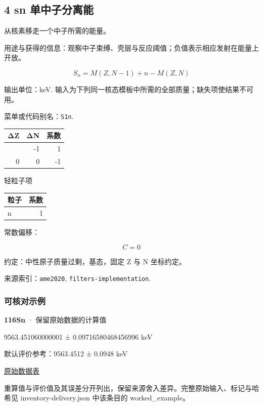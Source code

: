\documentclass[
  11pt,
  letterpaper,
]{article}
\begin{document}
\subsection{4 sn
单中子分离能}\label{sn-ux5355ux4e2dux5b50ux5206ux79bbux80fd}

从核素移走一个中子所需的能量。

用途与获得的信息：观察中子束缚、壳层与反应阈值；负值表示相应发射在能量上开放。

\[
S_n=M(Z,N-1)+n-M(Z,N)
\]

输出单位：keV.
输入为下列同一核态模板中所需的全部质量；缺失项使结果不可用。

菜单或代码别名：\texttt{S1n}.

\begin{longtable}[]{@{}rrr@{}}
\toprule\noalign{}
ΔZ & ΔN & 系数 \\
\midrule\noalign{}
\endhead
\bottomrule\noalign{}
\endlastfoot
0 & -1 & 1 \\
0 & 0 & -1 \\
\end{longtable}

轻粒子项

\begin{longtable}[]{@{}lr@{}}
\toprule\noalign{}
粒子 & 系数 \\
\midrule\noalign{}
\endhead
\bottomrule\noalign{}
\endlastfoot
n & 1 \\
\end{longtable}

常数偏移：

\[
C=0
\]

约定：中性原子质量过剩，基态，固定 Z 与 N 坐标约定。

来源索引：\texttt{ame2020}, \texttt{filters-implementation}.

\subsubsection{可核对示例}\label{ux53efux6838ux5bf9ux793aux4f8b-3}

\textbf{116Sn} · 保留原始数据的计算值

9563.451060000001 ± 0.09716580468456996 keV

默认评价参考：9563.4512 ± 0.0948 keV

\href{https://www-nds.iaea.org/amdc/ame2020/rct2_1.mas20.txt}{原始数据表}

重算值与评价值及其误差分开列出，保留来源舍入差异。完整原始输入、标记与哈希见
inventory-delivery.json 中该条目的 worked\_example。
\end{document}
